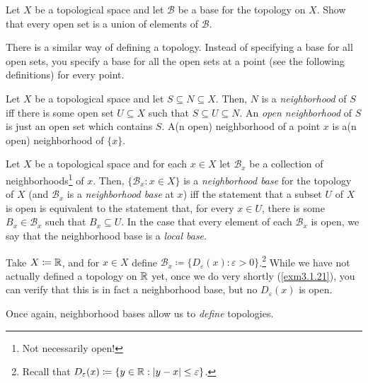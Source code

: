 \begin{exr}\label{exr4.1.7}
Let $X$ be a topological space and let $\mathcal{B}$ be a base for the topology on $X$.  Show that every open set is a union of elements of $\mathcal{B}$.
\end{exr}
There is a similar way of defining a topology.  Instead of specifying a base for all open sets, you specify a base for all the open sets at a point (see the following definitions) for every point.
\begin{dfn}[Neighborhood]\label{Neighborhood}
Let $X$ be a topological space and let $S\subseteq N\subseteq X$.  Then, $N$ is a \emph{neighborhood} of $S$ iff there is some open set $U\subseteq X$ such that $S\subseteq U\subseteq N$.  An \emph{open neighborhood} of $S$ is just an open set which contains $S$.  A(n open) neighborhood of a point $x$ is a(n open) neighborhood of $\{ x\}$.
\end{dfn}
\begin{dfn}\label{NeighborhoodBase}
Let $X$ be a topological space and for each $x\in X$ let $\mathcal{B}_x$ be a collection of neighborhoods\footnote{Not necessarily open!} of $x$.  Then, $\{ \mathcal{B}_x:x\in X\}$ is a \emph{neighborhood base} for the topology of $X$ (and $\mathcal{B}_x$ is a \emph{neighborhood base} at $x$) iff the statement that a subset $U$ of $X$ is open is equivalent to the statement that, for every $x\in U$, there is some $B_x\in \mathcal{B}_x$ such that $B_x\subseteq U$.  In the case that every element of each $\mathcal{B}_x$ is open, we say that the neighborhood base is a \emph{local base}.
\end{dfn}
\begin{exm}
Take $X\coloneqq \mathbb{R}$, and for $x\in X$ define $\mathcal{B}_x\coloneqq \{ D_{\varepsilon}(x):\varepsilon >0\}$.\footnote{Recall that $D_{\varepsilon}(x)\coloneqq \{ y\in \mathbb{R} :\lvert y-x\rvert\leq \varepsilon \}$.}  While we have not actually defined a topology on $\mathbb{R}$ yet, once we do very shortly (\cref{exm3.1.21}), you can verify that this is in fact a neighborhood base, but no $D_{\varepsilon}(x)$ is open.
\end{exm}
Once again, neighborhood bases allow us to \emph{define} topologies.
